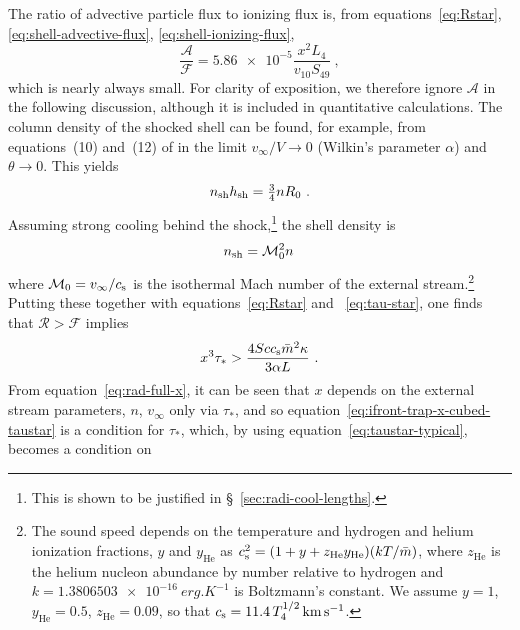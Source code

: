 The ratio of advective particle flux to ionizing flux is, from
equations~\eqref{eq:Rstar}, \eqref{eq:shell-advective-flux},
\eqref{eq:shell-ionizing-flux},
\begin{equation}
  \label{eq:advective-over-ionizing-flux}
  \frac{\mathcal{A}}{\mathcal{F}} = \num{5.86e-5} \frac{x^2 L_4}{v_{10} S_{49}} \ , 
\end{equation}
which is nearly always small.  For clarity of exposition, we therefore
ignore \(\mathcal{A}\) in the following discussion, although it is
included in quantitative calculations.  The column density of the
shocked shell can be found, for example, from equations~(10) and~(12)
of \citet{Wilkin:1996a} in the limit \(v_\infty/V \to 0\) (Wilkin's parameter
\(\alpha\)) and \(\theta \to 0\).  This yields
\begin{equation}
  \label{eq:shocked-shell-column}
  n\shell h\shell = \tfrac34 n R_0 \ .
\end{equation}
Assuming strong cooling behind the shock,\footnote{%
  This is shown to be justified in \S~\ref{sec:radi-cool-lengths}.
} %
the shell density is
\begin{equation}
  \label{eq:isothermal-shell-density}
  n\shell = \mathcal{M}_0^2 n \,
\end{equation}
where
\(\mathcal{M}_0 = v_\infty / \sound\) is the isothermal Mach number of the
external stream.\footnote{%
  \label{fn:temperature-dependence}
  The sound speed depends on the temperature and hydrogen and helium
  ionization fractions, \(y\) and \(y_{\text{He}}\) as
  \(\sound^2 = (1 + y + z_{\text{He}} y_{\text{He}}) (k T /
  \bar{m})\), where \(z_{\text{He}}\) is the helium nucleon abundance
  by number relative to hydrogen and
  \(k = \SI{1.3806503e-16}{erg.K^{-1}}\) is Boltzmann's constant.  We
  assume \(y = 1\), \(y_{\text{He}} = 0.5\), \(z_{\text{He}} = 0.09\),
  so that \(\sound = \num{11.4}\, T_4^{1/2}\, \si{km.s^{-1}}\). } %
Putting these together with equations~\eqref{eq:Rstar} and
~\eqref{eq:tau-star}, one finds that \(\mathcal{R} > \mathcal{F}\)
implies
\begin{equation}
  \label{eq:ifront-trap-x-cubed-taustar}
  x^3 \tau_* > \frac{4 S c \sound \bar{m}^2 \kappa}{3 \alpha L} \ .
\end{equation}
From equation~\eqref{eq:rad-full-x}, it can be seen that \(x\) depends
on the external stream parameters, \(n\), \(v_\infty\) only via
\(\tau_*\), and so equation~\eqref{eq:ifront-trap-x-cubed-taustar} is a
condition for \(\tau_*\), which, by using
equation~\eqref{eq:taustar-typical}, becomes a condition on
